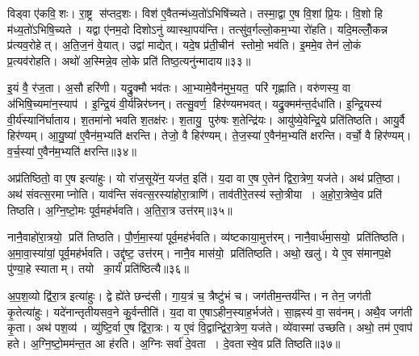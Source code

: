 विड्वा ए॑कवि॒शः।
रा॒ष्ट्र स॑प्तद॒शः।
विश॑ ए॒वैतन्म॑ध्य॒तो॑ऽभिषि॑च्यते।
तस्मा॒द्वा ए॒ष वि॒शां प्रि॒यः।
वि॒शो हि म॑ध्य॒तो॑ऽभिषि॒च्यते।
यद्वा ए॑नम॒दो दिशोऽनु॑ व्यास्था॒पय॑न्ति।
तत्सु॑व॒र्गल्लो॒कम॒भ्या रो॑हति।
यदि॒मल्लोँ॒कन्न प्र॑त्यव॒रोहेत्।
अ॒ति॒ज॒नं वे॒यात्।
उद्वा॑ माद्येत्।
यदे॒ष प्र॑ती॒चीन॑ स्तोमो॒ भव॑ति।
इ॒ममे॒व तेन॑ लो॒कं प्र॒त्यव॑रोहति।
अथो॑ अ॒स्मिन्ने॒व लो॒के प्रति॑ तिष्ठ॒त्यनु॑न्मादाय॥३३॥\anuvakamend[अक्र॑न्राज॒न्यो॑ भव॑न्ति दश॒पेयो॑ माद्ये॒त्रीणि॑ च]

इ॒यं वै॒ र॑ज॒ता।
अ॒सौ हरि॑णी।
यद्रु॒क्मौ भव॑तः।
आ॒भ्यामे॒वैन॑मुभ॒यत॒ परि॑ गृह्णाति।
वरु॑णस्य॒ वा अ॑भिषि॒च्यमा॑न॒स्याप॑।
इ॒न्द्रि॒यं वी॒र्य॑न्निर॑घ्नन्।
तत्सु॒वर्ण॒ हिर॑ण्यमभवत्।
यद्रु॒क्मम॑न्त॒र्दधा॑ति।
इ॒न्द्रि॒यस्य॑ वी॒र्य॑स्यानि॑र्घाताय।
श॒तमा॑नो भवति श॒तक्ष॑रः।
श॒तायु॒ पुरु॑षः श॒तेन्द्रि॑यः।
आयु॑ष्ये॒वेन्द्रि॒ये प्रति॑तिष्ठति।
आयु॒र्वै हिर॑ण्यम्।
आ॒यु॒ष्या॑ ए॒वैन॑म॒भ्यति॑ क्षरन्ति।
तेजो॒ वै हिर॑ण्यम्।
ते॒ज॒स्या॑ ए॒वैन॑म॒भ्यति॑ क्षरन्ति।
वर्चो॒ वै हिर॑ण्यम्।
व॒र्च॒स्या॑ ए॒वैन॑म॒भ्यति॑ क्षरन्ति॥३४॥\anuvakamend[श॒तक्ष॑रो॒ऽष्टौ च॑]

अप्र॑तिष्ठितो॒ वा ए॒ष इत्या॑हुः।
यो रा॑ज॒सूये॑न॒ यज॑त॒ इति॑।
य॒दा वा ए॒ष ए॒तेन॑ द्विरा॒त्रेण॒ यज॑ते।
अथ॑ प्रति॒ष्ठा।
अथ॑ संवत्स॒रमाप्नोति।
याव॑न्ति संवत्स॒रस्या॑होरा॒त्राणि॑।
ताव॑तीरे॒तस्य॑ स्तो॒त्रीया।
अ॒हो॒रा॒त्रेष्वे॒व प्रति॑ तिष्ठति।
अ॒ग्नि॒ष्टो॒मः पूर्व॒मह॑र्भवति।
अ॒ति॒रा॒त्र उत्त॑रम्॥३५॥

नानै॒वाहो॑रा॒त्रयो॒ प्रति॑ तिष्ठति।
पौ॒र्ण॒मा॒स्यां पूर्व॒मह॑र्भवति।
व्य॑ष्टकाया॒मुत्त॑रम्।
नानै॒वार्ध॑मा॒सयो॒ प्रति॑तिष्ठति।
अ॒मा॒वा॒स्या॑यां॒ पूर्व॒मह॑र्भवति।
उद्दृ॑ष्ट॒ उत्त॑रम्।
नानै॒व मास॑यो॒ प्रति॑तिष्ठति।
अथो॒ खलु॑।
ये ए॒व स॑मानप॒क्षे पु॑ण्या॒हे स्याताम्।
तयो का॒र्यं॑ प्रति॑ष्ठित्यै॥३६॥

अ॒प॒श॒व्यो द्वि॑रा॒त्र इत्या॑हुः।
द्वे ह्ये॑ते छन्द॑सी।
गा॒य॒त्रं च॒ त्रैष्टु॑भं च।
जग॑तीम॒न्तर्य॑न्ति।
न तेन॒ जग॑ती कृ॒तेत्या॑हुः।
यदे॑नान्तृतीयसव॒ने कु॒र्वन्तीति॑।
य॒दा वा ए॒षाऽहीन॒स्याह॒र्भज॑ते।
सा॒ह्नस्य॑ वा॒ सव॑नम्।
अथै॒व जग॑ती कृ॒ता।
अथ॑ पश॒व्य॑।
व्यु॑ष्टि॒र्वा ए॒ष द्वि॑रा॒त्रः।
य ए॒वं वि॒द्वान्द्वि॑रा॒त्रेण॒ यज॑ते।
व्ये॑वास्मा॑ उच्छति।
अथो॒ तम॑ ए॒वाप॑ हते।
अ॒ग्नि॒ष्टो॒मम॑न्त॒त आ ह॑रति।
अ॒ग्निः सर्वा॑ दे॒वता।
दे॒वतास्वे॒व प्रति॑ तिष्ठति॥३७॥\anuvakamend[उत्त॑रं॒ प्रति॑ष्ठित्यै पश॒व्य॑ स॒प्त च॑]
\clearpage

